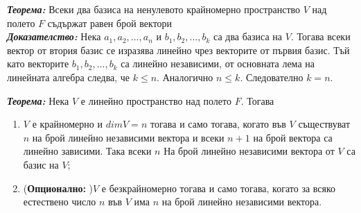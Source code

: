 \documentclass[11pt]{article} %
\newcommand{\italicBold}[1]{\textbf{\emph{#1}}}
\newcommand{\theorem}{\italicBold{Теорема: }}
\newcommand{\proof}{\italicBold{Доказателство: }}
\newcommand{\enumlet}{\renewcommand{\theenumi}{\alph{enumi}}}
\begin{document}
\theorem Всеки два базиса на ненулевото крайномерно пространство $V$ над полето $F$ съдържат равен брой вектори\\
\proof Нека $a_{1}, a_{2}, ..., a_{n}$ и $b_{1}, b_{2}, ..., b_{k}$ са два базиса на $V$. Тогава всеки вектор от втория базис се изразява линейно чрез векторите от първия базис. Тъй като векторите $b_{1}, b_{2}, ..., b_{k}$ са линейно независими, от основната лема на линейната алгебра следва, че $k \leq n$. Аналогично $n \leq k$. Следователно $k = n$. \\\par

\theorem Нека $V$ е линейно пространство над полето $F$. Тогава \\
\enumlet
\begin{enumerate}
	\item $V$ е крайномерно и $dimV = n$ тогава и само тогава, когато във $V$ съществуват $n$ на брой линейно независими вектора и всеки $n + 1$ на брой вектора са линейно зависими. Така всеки $n$ На брой линейно независими вектора от $V$ са базис на $V$; \\
	\item (\textbf{Опционално: })$V$ е безкрайномерно тогава и само тогава, когато за всяко естествено число $n$ във $V$ има $n$ на брой линейно независими вектора.\\
\end{enumerate}
 
\end{document}
